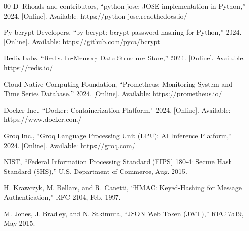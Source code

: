 \documentclass[conference]{IEEEtran}
\begin{document}
\begin{thebibliography}{00}
 D. Rhoads and contributors, ``python-jose: JOSE implementation in Python,'' 2024. [Online]. Available: https://python-jose.readthedocs.io/

 Py-bcrypt Developers, ``py-bcrypt: bcrypt password hashing for Python,'' 2024. [Online]. Available: https://github.com/pyca/bcrypt

 Redis Labs, ``Redis: In-Memory Data Structure Store,'' 2024. [Online]. Available: https://redis.io/

 Cloud Native Computing Foundation, ``Prometheus: Monitoring System and Time Series Database,'' 2024. [Online]. Available: https://prometheus.io/

 Docker Inc., ``Docker: Containerization Platform,'' 2024. [Online]. Available: https://www.docker.com/

 Groq Inc., ``Groq Language Processing Unit (LPU): AI Inference Platform,'' 2024. [Online]. Available: https://groq.com/

 NIST, ``Federal Information Processing Standard (FIPS) 180-4: Secure Hash Standard (SHS),'' U.S. Department of Commerce, Aug. 2015.

 H. Krawczyk, M. Bellare, and R. Canetti, ``HMAC: Keyed-Hashing for Message Authentication,'' RFC 2104, Feb. 1997.

 M. Jones, J. Bradley, and N. Sakimura, ``JSON Web Token (JWT),'' RFC 7519, May 2015.

\end{thebibliography}
\end{document}
